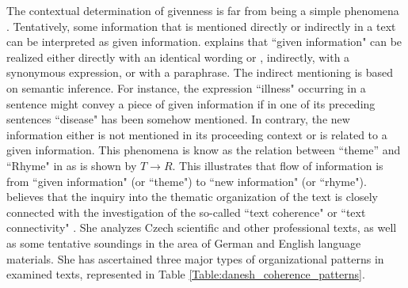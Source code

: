 The contextual determination of givenness is far from being a simple phenomena \cite{danes74a}. 
Tentatively, some information that is mentioned directly or indirectly in a text can be interpreted as given information. 
 explains that ``given information" can be realized either directly with an identical wording or , indirectly, with a synonymous expression, or with a paraphrase. 
The indirect mentioning is based on semantic inference. 
For instance, the expression ``illness" occurring in a sentence might convey a piece of given information if in one of its preceding sentences ``disease" has been somehow mentioned. 
In contrary, the new information either is not mentioned in its proceeding context or is related to a given information. 
This phenomena is know as the relation between ``theme'' and ``Rhyme" in  as is shown by  $T \rightarrow R$. 
This illustrates that flow of information is from ``given information" (or ``theme") to ``new information" (or ``rhyme").
 believes that the inquiry into the thematic organization of the text is closely connected with the investigation of the so-called ``text coherence" or ``text connectivity" .
She analyzes Czech scientific and other professional texts, as well as some tentative soundings in the area of German and English language materials.
She has ascertained  three major types of organizational patterns in examined texts, represented in Table \ref{Table:danesh_coherence_patterns}. 


